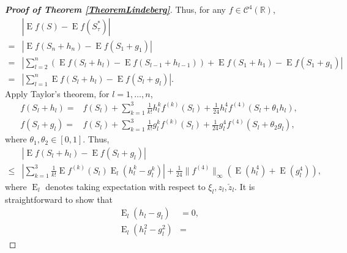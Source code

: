 \documentclass[smallextended]{svjour3}       %
\DeclareMathOperator{\myE}{E}
\begin{document}
\begin{proof}[\textbf{Proof of Theorem \ref{TheoremLindeberg}}]
    Thus, for any $f \in \mathscr C^4 (\mathbb R)$,
    \begin{equation*}
        \begin{split}
        &\left|\myE f\left(S\right)
        -
        \myE f\left(S_\tau^*\right)\right| 
        \\
        =&
        \left| \myE f(S_n+h_n)-\myE f(S_1+g_1)\right|
        \\
        =&
        \left|\sum_{l=2}^{n} \left(\myE f(S_{l}+h_{l})-\myE f(S_{l-1}+h_{l-1})\right)+\myE f(S_{1}+h_{1})-\myE f(S_{1}+g_{1})\right|
        \\
        = &
       \left| \sum_{l=1}^{n} \myE f(S_{l}+h_{l})-\myE f(S_{l}+g_{l})\right|
       .
        \end{split}
    \end{equation*}
    Apply Taylor's theorem, for $l=1,\ldots,n$,
    \begin{equation*}
        \begin{split}
            f(S_{l}+h_{l})=&
            f(S_{l})
            +
            \sum_{k=1}^3
            \frac{1}{k!} h_l^k f^{(k)} (S_{l})
            +
            \frac{1}{24}h_{l}^4 f^{(4)} (S_{l}+\theta_1 h_{l}),
            \\
            f(S_{l}+g_{l})=&
            f(S_{l})
            +
            \sum_{k=1}^3
            \frac{1}{k!} g_l^k f^{(k)} (S_{l})
            +
            \frac{1}{24}g_{l}^4 f^{(4)} (S_{l}+\theta_{2} g_{l}),
        \end{split}
    \end{equation*}
    where $\theta_1,\theta_2\in[0,1]$.
    Thus,
    \begin{equation*}
        \begin{split}
             &\left| \myE f(S_{l}+h_{l})-\myE f(S_{l}+g_{l})\right|
             \\
\leq&
\left|
            \sum_{k=1}^3
            \frac{1}{k!} \myE f^{(k)} (S_{l})
            \myE_l (h_l^k - g_l^k)
            \right|
            +
            \frac{1}{24} \|f^{(4)} \|_{\infty} \left(\myE (h_{l}^4)+\myE (g_{l}^4)\right),
        \end{split}
    \end{equation*}
where $\myE_l$ denotes taking expectation with respect to $\xi_l, z_l ,\check z_l$.
It is straightforward to show that
\begin{equation*}
    \begin{split}
        \myE_l (h_l-g_l)&=0, 
        \\
        \myE_l (h_l^2-g_l^2)&= 

\end{split}
\end{equation*}
\end{proof}
\end{document}
